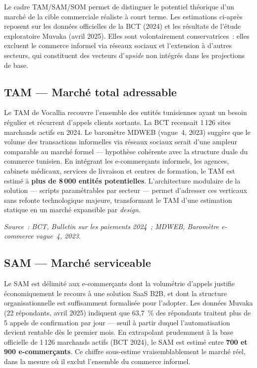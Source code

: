 Le cadre TAM/SAM/SOM permet de distinguer le potentiel théorique d'un marché de la cible commerciale réaliste à court terme. Les estimations ci-après reposent sur les données officielles de la BCT (2024) et les résultats de l'étude exploratoire Muvaka (avril 2025). Elles sont volontairement conservatrices~: elles excluent le commerce informel via réseaux sociaux et l'extension à d'autres secteurs, qui constituent des vecteurs d'\emph{upside} non intégrés dans les projections de base.

\subsection{TAM --- Marché total adressable}
\label{section2.3.1}

Le TAM de Vocallia recouvre l'ensemble des entités tunisiennes ayant un besoin régulier et récurrent d'appels clients sortants. La BCT recensait 1\,126 sites marchands actifs en 2024. Le baromètre MDWEB (vague~4, 2023) suggère que le volume des transactions informelles via réseaux sociaux serait d'une ampleur comparable au marché formel --- hypothèse cohérente avec la structure duale du commerce tunisien. En intégrant les e-commerçants informels, les agences, cabinets médicaux, services de livraison et centres de formation, le TAM est estimé à \textbf{plus de 8\,000 entités potentielles}. L'architecture modulaire de la solution --- scripts paramétrables par secteur --- permet d'adresser ces verticaux sans refonte technologique majeure, transformant le TAM d'une estimation statique en un marché expansible par \emph{design}.

\textit{Source~: BCT, Bulletin sur les paiements 2024~; MDWEB, Baromètre e-commerce vague~4, 2023.}

\subsection{SAM --- Marché serviceable}
\label{section2.3.2}

Le SAM est délimité aux e-commerçants dont la volumétrie d'appels justifie économiquement le recours à une solution SaaS B2B, et dont la structure organisationnelle est suffisamment formalisée pour l'adopter. Les données Muvaka (22 répondants, avril 2025) indiquent que 63,7~\% des répondants traitent plus de 5 appels de confirmation par jour --- seuil à partir duquel l'automatisation devient rentable dès le premier mois. En extrapolant prudemment à la base officielle de 1\,126 marchands actifs (BCT 2024), le SAM est estimé entre \textbf{700 et 900 e-commerçants}. Ce chiffre sous-estime vraisemblablement le marché réel, dans la mesure où il exclut l'ensemble du commerce informel.

